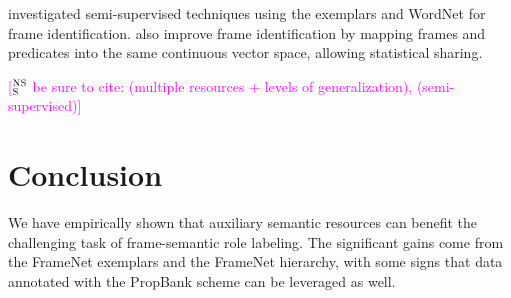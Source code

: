 \documentclass[11pt,a4paper]{article}
\newcommand{\ensuretext}[1]{#1}
\newcommand{\nssmarker}{\ensuretext{\textcolor{magenta}{\ensuremath{^{\textsc{NS}}_{\textsc{S}}}}}}
\newcommand{\mkmarker}{\ensuretext{\textcolor{red}{\ensuremath{^{\textsc{M}}_{\textsc{K}}}}}}
\newcommand{\arkcomment}[3]{\ensuretext{\textcolor{#3}{[#1 #2]}}}
\newcommand{\nss}[1]{\arkcomment{\nssmarker}{#1}{magenta}}
\newcommand{\mk}[1]{\arkcomment{\mkmarker}{#1}{red}}
\newcommand{\finalversion}[1]{}
\begin{document}
\citet{das-11,das-12} investigated semi-supervised techniques using the exemplars and WordNet for frame identification.
\citet{hermann-14} also improve frame identification by mapping frames
and predicates into the same continuous vector space, allowing
statistical sharing.

\nss{be sure to cite: \citep{merlo-09} (multiple resources + levels of generalization), \citep{furstenau-09} (semi-supervised)}



\section{Conclusion}

We have empirically shown that auxiliary semantic resources
can benefit the challenging task of frame-semantic role labeling. 
The significant gains come from the FrameNet exemplars and the FrameNet hierarchy, with
some signs that data annotated with the PropBank scheme can be leveraged as well.


\finalversion{We are optimistic that future improvements to lexical semantic resources, 
including planned changes for PropBank \citep{bonial-14} and SemLink \citep{bonial-13}, 
will lead to further gains in this task. 
Moreover, the techniques discussed here could be further explored 
using semi-automatic mappings between lexical resources \citep[such as UBY;][]{gurevych-12}, 
and correspondingly, this task could be used to extrinsically validate those mappings.}
\finalversion{\nss{release of code and models}}

\finalversion{\section*{Acknowledgments}

FUNDING}

\smaller


\setlength{\bibsep}{1pt}
{\fontsize{10}{12.25}\selectfont
}
\end{document}
